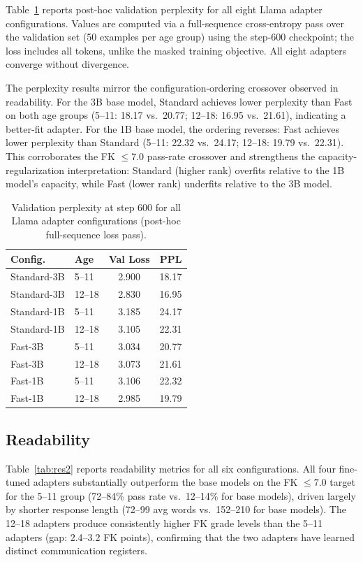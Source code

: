 \documentclass[journal]{IEEEtai}
\begin{document}
Table~\ref{tab:res1} reports post-hoc validation perplexity for all eight Llama adapter configurations. Values are computed via a full-sequence cross-entropy pass over the validation set (50 examples per age group) using the step-600 checkpoint; the loss includes all tokens, unlike the masked training objective. All eight adapters converge without divergence.

The perplexity results mirror the configuration-ordering crossover observed in readability. For the 3B base model, Standard achieves lower perplexity than Fast on both age groups (5--11: 18.17 vs.\ 20.77; 12--18: 16.95 vs.\ 21.61), indicating a better-fit adapter. For the 1B base model, the ordering reverses: Fast achieves lower perplexity than Standard (5--11: 22.32 vs.\ 24.17; 12--18: 19.79 vs.\ 22.31). This corroborates the FK $\leq 7.0$ pass-rate crossover and strengthens the capacity-regularization interpretation: Standard (higher rank) overfits relative to the 1B model's capacity, while Fast (lower rank) underfits relative to the 3B model.

\begin{table}[!t]
  \centering
  \caption{Validation perplexity at step 600 for all Llama adapter configurations (post-hoc full-sequence loss pass).}
  \label{tab:res1}
  \small
  \begin{tabular}{llcc}
    \hline
    Config. & Age & Val Loss & PPL \\
    \hline
    Standard-3B & 5--11  & 2.900 & 18.17 \\
    Standard-3B & 12--18 & 2.830 & 16.95 \\
    Standard-1B & 5--11  & 3.185 & 24.17 \\
    Standard-1B & 12--18 & 3.105 & 22.31 \\
    Fast-3B     & 5--11  & 3.034 & 20.77 \\
    Fast-3B     & 12--18 & 3.073 & 21.61 \\
    Fast-1B     & 5--11  & 3.106 & 22.32 \\
    Fast-1B     & 12--18 & 2.985 & 19.79 \\
    \hline
  \end{tabular}
\end{table}

\subsection{Readability}

Table~\ref{tab:res2} reports readability metrics for all six configurations. All four fine-tuned adapters substantially outperform the base models on the FK $\leq 7.0$ target for the 5--11 group (72--84\% pass rate vs.\ 12--14\% for base models), driven largely by shorter response length (72--99 avg words vs.\ 152--210 for base models). The 12--18 adapters produce consistently higher FK grade levels than the 5--11 adapters (gap: 2.4--3.2 FK points), confirming that the two adapters have learned distinct communication registers.
\end{document}
